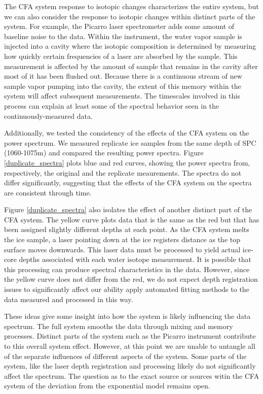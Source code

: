 \documentclass[draft, jgrga]{AGUTeX}
\begin{document}
\begin{article}
The CFA system response to isotopic changes characterizes the entire system, but we can also consider the response to isotopic changes within distinct parts of the system. For example, the Picarro laser spectrometer adds some amount of baseline noise to the data. Within the instrument, the water vapor sample is injected into a cavity where the isotopic composition is determined by measuring how quickly certain frequencies of a laser are absorbed by the sample. This measurement is affected by the amount of sample that remains in the cavity after most of it has been flushed out. Because there is a continuous stream of new sample vapor pumping into the cavity, the extent of this memory within the system will affect subsequent measurements. The timescales involved in this process can explain at least some of the spectral behavior seen in the continuously-measured data.

Additionally, we tested the consistency of the effects of the CFA system on the power spectrum. We measured replicate ice samples from the same depth of SPC (1060-1075m) and compared the resulting power spectra. Figure \ref{duplicate_spectra} plots blue and red curves, showing the power spectra from, respectively, the original and the replicate meaurements. The spectra do not differ significantly, suggesting that the effects of the CFA system on the spectra are consistent through time.

Figure \ref{duplicate_spectra} also isolates the effect of another distinct part of the CFA system. The yellow curve plots data that is the same as the red but that has been assigned slightly different depths at each point. As the CFA system melts the ice sample, a laser pointing down at the ice registers distance as the top surface moves downwards. This laser data must be processed to yield actual ice-core depths associated with each water isotope measurement. It is possible that this processing can produce spectral characteristics in the data. However, since the yellow curve does not differ from the red, we do not expect depth registration issues to significantly affect our ability apply automated fitting methods to the data measured and processed in this way.

These ideas give some insight into how the system is likely influencing the data spectrum. The full system smooths the data through mixing and memory processes. Distinct parts of the system such as the Picarro instrument contribute to this overall system effect. However, at this point we are unable to untangle all of the separate influences of different aspects of the system. Some parts of the system, like the laser depth registration and processing likely do not significantly affect the spectrum. The question as to the exact source or sources witin the CFA system of the deviation from the exponential model remains open.


\end{article}
\end{document}
